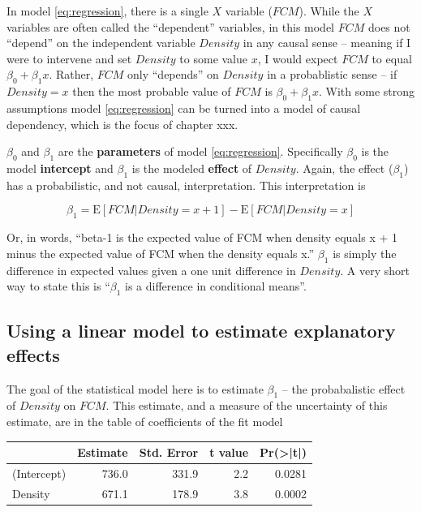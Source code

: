 \documentclass[]{book}
\begin{document}
In model \eqref{eq:regression}, there is a single \(X\) variable
(\(FCM\)). While the \(X\) variables are often called the ``dependent''
variables, in this model \(FCM\) does not ``depend'' on the independent
variable \(Density\) in any causal sense -- meaning if I were to
intervene and set \(Density\) to some value \(x\), I would expect
\(FCM\) to equal \(\beta_0 + \beta_1 x\). Rather, \(FCM\) only
``depends'' on \(Density\) in a probablistic sense -- if \(Density = x\)
then the most probable value of \(FCM\) is \(\beta_0 + \beta_1 x\). With
some strong assumptions model \eqref{eq:regression} can be turned into a
model of causal dependency, which is the focus of chapter xxx.

\(\beta_0\) and \(\beta_1\) are the \textbf{parameters} of model
\eqref{eq:regression}. Specifically \(\beta_0\) is the model
\textbf{intercept} and \(\beta_1\) is the modeled \textbf{effect} of
\(Density\). Again, the effect (\(\beta_1\)) has a probabilistic, and
not causal, interpretation. This interpretation is

\begin{equation}
\beta_1 = \textrm{E}[FCM|Density=x+1] - \textrm{E}[FCM|Density=x] 
\label{eq:beta1}
\end{equation}

Or, in words, ``beta-1 is the expected value of FCM when density equals
x + 1 minus the expected value of FCM when the density equals x.''
\(\beta_1\) is simply the difference in expected values given a one unit
difference in \(Density\). A very short way to state this is
``\(\beta_1\) is a difference in conditional means''.

\subsection{Using a linear model to estimate explanatory
effects}\label{using-a-linear-model-to-estimate-explanatory-effects}

The goal of the statistical model here is to estimate \(\beta_1\) -- the
probabalistic effect of \(Density\) on \(FCM\). This estimate, and a
measure of the uncertainty of this estimate, are in the table of
coefficients of the fit model

\begin{tabular}{l|r|r|r|r}
\hline
  & Estimate & Std. Error & t value & Pr(>|t|)\\
\hline
(Intercept) & 736.0 & 331.9 & 2.2 & 0.0281\\
\hline
Density & 671.1 & 178.9 & 3.8 & 0.0002\\
\hline
\end{tabular}
\end{document}
